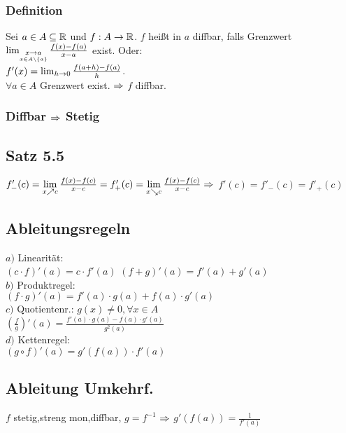 \subsubsection*{Definition}
Sei $a \in A \subseteq \mathbb R$ und $f: A \rightarrow \mathbb R$. $f$ heißt in $a$ diffbar, falls Grenzwert $\lim_{\underset{x \in A\backslash\{a\}}{x \rightarrow a}} \frac{f(x) - f(a)}{x - a}$ exist. 
Oder:\\$f'(x) = \lim_{h \rightarrow 0} \frac{f(a + h) - f(a)}{h}$.\\
$\forall a \in A$ Grenzwert exist. $\Rightarrow$ $f$ diffbar.

\subsubsection*{Diffbar \texorpdfstring{$\Rightarrow$}{folgt} Stetig}
\subsection*{Satz 5.5}
$f'_{-}(c) = \lim\limits_{x \nearrow c} \frac{f(x) - f(c)}{x - c} = f'_{+}(c) = \lim\limits_{x \searrow c} \frac{f(x) - f(c)}{x - c} \Rightarrow$ $f'(c) = f'_{-}(c) = f'_{+}(c)$
\subsection*{Ableitungsregeln}
    $a)$ Linearität:\\
    $(c \cdot f)'(a) = c \cdot f'(a)$
    $(f + g)'(a) = f'(a) + g'(a)$\\
    $b)$ Produktregel:\\
    $(f \cdot g)'(a) = f'(a) \cdot g(a) + f(a) \cdot g'(a)$\\
    $c)$ Quotientenr.: $g(x) \neq 0, \forall x \in A$\\
    $\left(\frac{f}{g}\right)'(a) = \frac{f'(a) \cdot g(a) - f(a) \cdot g'(a)}{g^2(a)}$\\
    $d)$ Kettenregel:\\
    $(g \circ f)'(a) = g'(f(a)) \cdot f'(a)$
\subsection*{Ableitung Umkehrf.}
$f$ stetig,streng mon,diffbar, $g=f^{-1}$ $\Rightarrow$ $g'(f(a)) = \frac{1}{f'(a)}$
